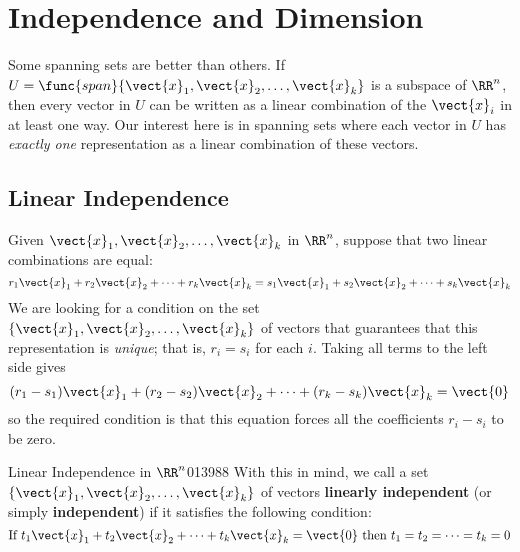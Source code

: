 \section{Independence and Dimension}
\label{sec:5_2}

Some spanning sets are better than others. If $U = \func{span}\{\vect{x}_{1}, \vect{x}_{2}, \dots, \vect{x}_{k}\}$ is a subspace of $\RR^n$, then every vector in $U$ can be written as a linear combination of the $\vect{x}_{i}$ in at least one way. Our interest here is in spanning sets where each vector in $U$ has \textit{exactly one} representation as a linear combination of these vectors.

\subsection*{Linear Independence}

Given $\vect{x}_{1}, \vect{x}_{2}, \dots, \vect{x}_{k}$ in $\RR^n$, suppose that two linear combinations are equal:
\begin{equation*}
r_1\vect{x}_1 + r_2\vect{x}_2 + \dots + r_k\vect{x}_k = s_1\vect{x}_1 + s_2\vect{x}_2 + \dots + s_k\vect{x}_k
\end{equation*}
We are looking for a condition on the set $\{\vect{x}_{1}, \vect{x}_{2}, \dots, \vect{x}_{k}\}$ of vectors that guarantees that this representation is \textit{unique}; that is, $r_{i} = s_{i}$ for each $i$. Taking all terms to the left side gives
\begin{equation*}
(r_1 - s_1)\vect{x}_1 + (r_2 - s_2)\vect{x}_2 + \dots + (r_k - s_k)\vect{x}_k = \vect{0}
\end{equation*}
so the required condition is that this equation forces all the coefficients $r_{i} - s_{i}$ to be zero.

\begin{definition}{Linear Independence in $\RR^n$}{013988}
With this in mind, we call a set $\{\vect{x}_{1}, \vect{x}_{2}, \dots, \vect{x}_{k}\}$ of vectors \textbf{linearly independent} (or simply \textbf{independent}) if it satisfies the following condition:
\begin{equation*}
\mbox{If } t_1\vect{x}_1 + t_2\vect{x}_2 + \dots + t_k\vect{x}_k = \vect{0} \mbox{ then } t_1 = t_2 = \dots = t_k = 0
\end{equation*}
\end{definition}

